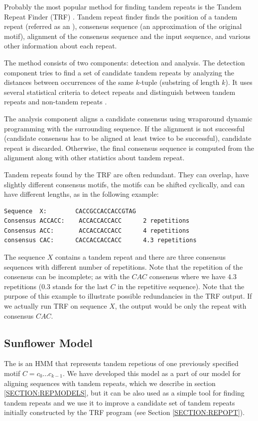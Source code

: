 Probably the most popular method for finding tandem repeats is the Tandem
Repeat Finder (TRF) \cite{Benson1999}.  Tandem repeat finder finds the position
of a tandem repeat (referred as an ), consensus sequence
(an approximation of the original motif), alignment of the consensus sequence
and the input sequence, and various other information about each repeat.

The method consists of two components: detection and analysis. The detection
component tries to find a set of candidate tandem repeats by analyzing the
distances between occurrences of the same $k$-tuple (substring of length $k$).
It uses several statistical criteria to detect repeats and distinguish between
tandem repeats and non-tandem repeats \cite{Benson1999}.

The analysis component aligns a candidate consensus using wraparound dynamic
programming \cite{Myers1989} with the surrounding sequence. If the alignment is
not successful (candidate consensus has to be aligned at least twice to be
successful), candidate repeat is discarded. Otherwise, the final consensus
sequence is computed from the alignment along with other statistics about
tandem repeat.

Tandem repeats found by the TRF are often redundant.  They can overlap, have slightly
different consensus motifs, the motifs can be shifted cyclically, and can have
different lengths, as in the following example:

\begin{verbatim}
Sequence  X:        CACCGCCACCACCGTAG
Consensus ACCACC:    ACCACCACCACC      2 repetitions
Consensus ACC:       ACCACCACCACC      4 repetitions
consensus CAC:      CACCACCACCACC      4.3 repetitions
\end{verbatim}

The sequence $X$ contains a tandem repeat and there are three consensus
sequences with different number of repetitions. Note that the repetition of the
consensus can be incomplete; as with the $CAC$ consensus where we have $4.3$
repetitions ($0.3$ stands for the last $C$ in the repetitive sequence).  Note
that the purpose of this example to illustrate possible redundancies in the TRF
output.  If we actually run TRF on sequence $X$, the output would be only the
repeat with consensus $CAC$.

\subsection{Sunflower Model}\label{SECTION:SUNFLOWERMODEL}
The  is an HMM that represents tandem repetious of
one previously specified motif $C=c_0\dots c_{k-1}$. We have developed this
model as a part of our model for aligning sequences with tandem repeats, which
we describe in section \ref{SECTION:REPMODELS}, but it can be also used as a
simple tool for finding tandem repeats and we use it to improve a candidate set
of tandem repeats initially constructed by the TRF program (see Section
\ref{SECTION:REPOPT}).

